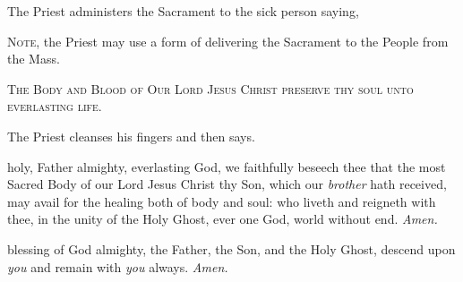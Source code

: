 \begin{rubric}
    The Priest administers the Sacrament to the sick person saying,\par
    \textsc{Note,} the Priest may use a form of delivering the Sacrament to the People from the Mass.
\end{rubric}
\begin{center}
    \textsc{The Body and Blood of Our Lord Jesus Christ preserve thy soul unto everlasting life.}
\end{center}

\clearpage
\begin{rubric}
    The Priest cleanses his fingers and then says.
\end{rubric}
{} holy, Father almighty, everlasting God, we faithfully beseech thee that the most Sacred Body of our Lord Jesus Christ thy Son, which our \textit{brother} hath received, may avail for the healing both of body and soul: who liveth and reigneth with thee, in the unity of the Holy Ghost, ever one God, world without end. \textit{Amen.}

 blessing of God almighty, the Father, {} the Son, and the Holy Ghost, descend upon \textit{you} and remain with \textit{you} always. \textit{Amen.}

